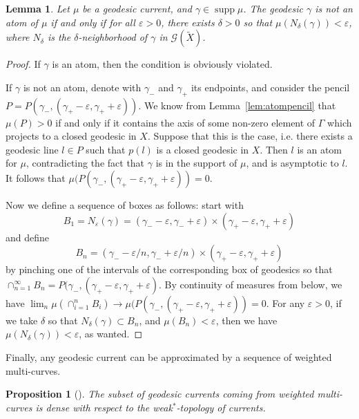 \documentclass[12pt,article]{amsart}
\numberwithin{equation}{section}
\numberwithin{figure}{section}
\newtheorem{lemma}[equation]{Lemma}
\newtheorem{proposition}[equation]{Proposition}
\theoremstyle{definition}
\theoremstyle{plain}
\newcommand\G{\ensuremath{\mathcal{G}}}
\newcommand*{\wt}[1]{\widetilde{#1}}
\renewcommand{\epsilon}{\varepsilon}
\DeclareMathOperator{\supp}{supp}
\begin{document}
\begin{lemma}
Let $\mu$ be a geodesic current, and $\gamma \in \supp \mu$.
The geodesic $\gamma$ is not an atom of $\mu$ if and only if for all $\epsilon>0$, there exists $\delta>0$ so that $\mu(N_{\delta}(\gamma))<\epsilon$, where $N_{\delta}$ is the $\delta$-neighborhood of $\gamma$ in $\G(\wt{X})$.
\label{lem:shrinkingatom}
\end{lemma}
\begin{proof}
If $\gamma$ is an atom, then the condition is obviously violated.

If $\gamma$ is not an atom, denote with $\gamma_{-}$ and $\gamma_{+}$ its endpoints, and consider the pencil $P = P \left( \gamma_-, (\gamma_+-\epsilon,\gamma_+ + \epsilon ) \right)$.
We know from Lemma~\ref{lem:atompencil} that $\mu(P) > 0$ if and only if it contains the axis of some non-zero element of $\Gamma$ which projects to a closed geodesic in $X$. Suppose that this is the case, i.e. there exists a geodesic line $l \in P$ such that $p(l)$ is a closed geodesic in $X$. Then $l$ is an atom for $\mu$, contradicting the fact that $\gamma$ is in the support of $\mu$, and is asymptotic to $l$. It follows that $\mu(P(\gamma_-, (\gamma_+-\epsilon,\gamma_+ + \epsilon ))=0$.

Now we define a sequence of boxes as follows: start with \[B_1 = N_\epsilon (\gamma) = (\gamma_{-} - \epsilon , \gamma_{-} + \epsilon) \times ( \gamma_{+} -\epsilon, \gamma_{+} + \epsilon)\] and define \[ B_n =(\gamma_{-} - \epsilon/n , \gamma_{-} + \epsilon/n ) \times ( \gamma_{+} -\epsilon, \gamma_{+} + \epsilon) \] by pinching one of the intervals of the corresponding box of geodesics so that $\cap_{n=1}^{\infty} B_n  = P(\gamma_-, (\gamma_+-\epsilon,\gamma_+ + \epsilon )$.
By continuity of measures from below, we have $\lim_n \mu(\cap_{i=1}^n B_i) \to \mu(P(\gamma_-, (\gamma_+-\epsilon,\gamma_+ + \epsilon ))=0$. For any $\epsilon>0$, if we take $\delta$ so that $N_{\delta}(\gamma) \subset B_n$, and $\mu(B_n)<\epsilon$, then we have $\mu(N_{\delta}(\gamma))<\epsilon$, as wanted.
\end{proof}


Finally, any geodesic current can be approximated by a sequence of weighted multi-curves.

\begin{proposition}[{\cite[Proposition~4.4]{Bonahon86:EndsHyperbolicManifolds}}]
The subset of geodesic currents coming from weighted multi-curves is dense with respect to the weak$^*$-topology of currents.
\end{proposition}
\end{document}
